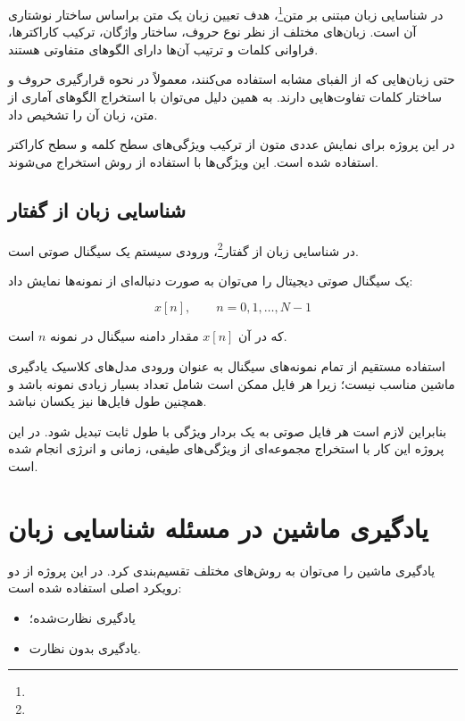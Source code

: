 در شناسایی زبان مبتنی بر متن\footnote{}، هدف تعیین زبان یک متن براساس ساختار نوشتاری آن است. زبان‌های مختلف از نظر نوع حروف، ساختار واژگان، ترکیب کاراکترها، فراوانی کلمات و ترتیب آن‌ها دارای الگوهای متفاوتی هستند.

حتی زبان‌هایی که از الفبای مشابه استفاده می‌کنند، معمولاً در نحوه قرارگیری حروف و ساختار کلمات تفاوت‌هایی دارند. به همین دلیل می‌توان با استخراج الگوهای آماری از متن، زبان آن را تشخیص داد.

در این پروژه برای نمایش عددی متون از ترکیب ویژگی‌های سطح کلمه و سطح کاراکتر استفاده شده است. این ویژگی‌ها با استفاده از روش
استخراج می‌شوند.


\subsection{شناسایی زبان از گفتار}

در شناسایی زبان از گفتار\footnote{}، ورودی سیستم یک سیگنال صوتی است.

یک سیگنال صوتی دیجیتال را می‌توان به صورت دنباله‌ای از نمونه‌ها نمایش داد:

\begin{equation}
x[n], \qquad n=0,1,\ldots,N-1
\end{equation}

که در آن $x[n]$ مقدار دامنه سیگنال در نمونه $n$ است.

استفاده مستقیم از تمام نمونه‌های سیگنال به عنوان ورودی مدل‌های کلاسیک یادگیری ماشین مناسب نیست؛ زیرا هر فایل ممکن است شامل تعداد بسیار زیادی نمونه باشد و همچنین طول فایل‌ها نیز یکسان نباشد.

بنابراین لازم است هر فایل صوتی به یک بردار ویژگی با طول ثابت تبدیل شود. در این پروژه این کار با استخراج مجموعه‌ای از ویژگی‌های طیفی، زمانی و انرژی انجام شده است.


\section{یادگیری ماشین در مسئله شناسایی زبان}

یادگیری ماشین را می‌توان به روش‌های مختلف تقسیم‌بندی کرد. در این پروژه از دو رویکرد اصلی استفاده شده است:

\begin{itemize}
	\item یادگیری نظارت‌شده؛
	\item یادگیری بدون نظارت.
\end{itemize}


